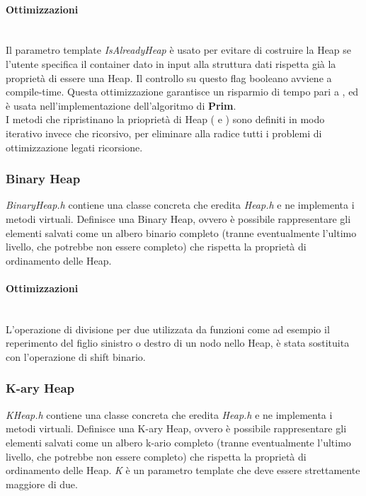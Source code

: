 \paragraph{Ottimizzazioni}\mbox{} \\

\noindent Il parametro template \textit{IsAlreadyHeap} è usato per evitare di costruire la Heap se l'utente specifica il container dato in input alla struttura dati rispetta già la proprietà di essere una Heap. Il controllo su questo flag booleano avviene a compile-time. Questa ottimizzazione garantisce un risparmio di tempo pari a \complexityN{}, ed è usata nell'implementazione dell'algoritmo di \textbf{Prim}. \\

\noindent I metodi che ripristinano la prioprietà di Heap ( e ) sono definiti in modo iterativo invece che ricorsivo, per eliminare alla radice tutti i problemi di ottimizzazione legati ricorsione.

\subsubsection{Binary Heap}

\textit{BinaryHeap.h} contiene una classe concreta che eredita \textit{Heap.h} e ne implementa i metodi virtuali. Definisce una Binary Heap, ovvero è possibile rappresentare gli elementi salvati come un albero binario completo (tranne eventualmente l'ultimo livello, che potrebbe non essere completo) che rispetta la proprietà di ordinamento delle Heap.

\paragraph{Ottimizzazioni}\mbox{} \\

\noindent L'operazione di divisione per due utilizzata da funzioni come ad esempio il reperimento del figlio sinistro o destro di un nodo nello Heap, è stata sostituita con l'operazione di shift binario.

\subsubsection{K-ary Heap}

\textit{KHeap.h} contiene una classe concreta che eredita \textit{Heap.h} e ne implementa i metodi virtuali. Definisce una K-ary Heap, ovvero è possibile rappresentare gli elementi salvati come un albero k-ario completo (tranne eventualmente l'ultimo livello, che potrebbe non essere completo) che rispetta la proprietà di ordinamento delle Heap.
\textit{K} è un parametro template che deve essere strettamente maggiore di due.

